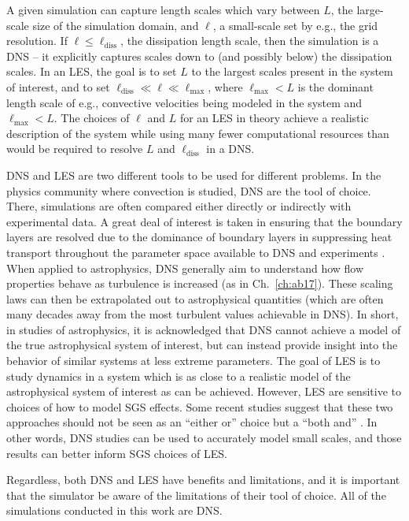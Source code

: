 A given simulation can capture length scales which vary between $L$, the large-scale size of the simulation domain, and $\ell$, a small-scale set by e.g., the grid resolution.
If $\ell \leq \ell_{\text{diss}}$, the dissipation length scale, then the simulation is a DNS -- it explicitly captures scales down to (and possibly below) the dissipation scales.
In an LES, the goal is to set $L$ to the largest scales present in the system of interest, and to set $\ell_{\text{diss}} \ll \ell \ll \ell_{\text{max}}$, where $\ell_{\text{max}} < L$ is the dominant length scale of e.g., convective velocities being modeled in the system and $\ell_{\text{max}} < L$.
The choices of $\ell$ and $L$ for an LES in theory achieve a realistic description of the system while using many fewer computational resources than would be required to resolve $L$ and $\ell_{\text{diss}}$ in a DNS.

DNS and LES are two different tools to be used for different problems.
In the physics community where \RB convection is studied, DNS are the tool of choice.
There, simulations are often compared either directly or indirectly with experimental data.
A great deal of interest is taken in ensuring that the boundary layers are resolved \citep{shishkina&all2010} due to the dominance of boundary layers in suppressing heat transport throughout the parameter space available to DNS and experiments \citep{ahlers&all2009}.
When applied to astrophysics, DNS generally aim to understand how flow properties behave as turbulence is increased (as in Ch.~\ref{ch:ab17}).
These scaling laws can then be extrapolated out to astrophysical quantities (which are often many decades away from the most turbulent values achievable in DNS).
In short, in studies of astrophysics, it is acknowledged that DNS cannot achieve a model of the true astrophysical system of interest, but can instead provide insight into the behavior of similar systems at less extreme parameters.
The goal of LES is to study dynamics in a system which is as close to a realistic model of the astrophysical system of interest as can be achieved.
However, LES are sensitive to choices of how to model SGS effects.
Some recent studies suggest that these two approaches should not be seen as an ``either or'' choice but a ``both and'' \citep{mellado&all2018}.
In other words, DNS studies can be used to accurately model small scales, and those results can better inform SGS choices of LES.

Regardless, both DNS and LES have benefits and limitations, and it is important that the simulator be aware of the limitations of their tool of choice.
All of the simulations conducted in this work are DNS.

